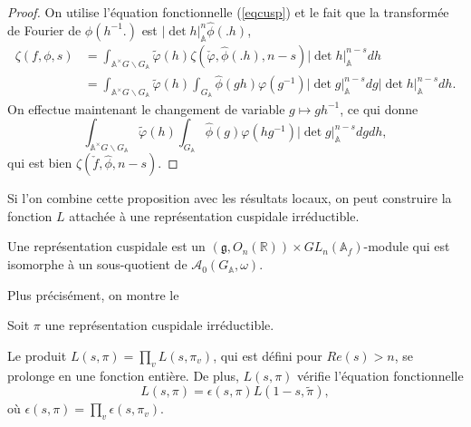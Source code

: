 \begin{proof}
On utilise l'équation fonctionnelle (\ref{eqcusp}) et le fait que la transformée de Fourier de $\phi(h^{-1}.)$ est $|\det h|_\mathbb{A}^n\hat{\phi}(.h)$,
\begin{align}
\zeta(f, \phi, s) &= \int_{\mathbb{A}^\times G \backslash G_\mathbb{A}} \tilde{\varphi}(h) \zeta(\check{\varphi}, \hat{\phi}(.h), n-s)|\det h|_\mathbb{A}^{n-s} dh \\
&= \int_{\mathbb{A}^\times G \backslash G_\mathbb{A}} \tilde{\varphi}(h) \int_{G_\mathbb{A}}\hat{\phi}(gh)\varphi(g^{-1})|\det g|_\mathbb{A}^{n-s} dg |\det h|_\mathbb{A}^{n-s} dh.
\end{align}
On effectue maintenant le changement de variable $g \mapsto gh^{-1}$, ce qui donne
\begin{equation}
\int_{\mathbb{A}^\times G \backslash G_\mathbb{A}} \tilde{\varphi}(h) \int_{G_\mathbb{A}}\hat{\phi}(g)\varphi(hg^{-1})|\det g|_\mathbb{A}^{n-s} dg dh,
\end{equation}
qui est bien $\zeta(\check{f}, \hat{\phi}, n-s)$.
\end{proof}

Si l'on combine cette proposition avec les résultats locaux, on peut construire la fonction $L$ attachée à une représentation cuspidale irréductible.
\begin{definition}
Une représentation cuspidale est un $(\mathfrak{g}, O_n(\mathbb{R})) \times GL_n(\mathbb{A}_f)$-module qui est isomorphe à un sous-quotient de $\mathcal{A}_0(G_\mathbb{A}, \omega)$.
\end{definition}

Plus précisément, on montre le
\begin{theoreme}
Soit $\pi$ une représentation cuspidale irréductible.

Le produit $L(s, \pi) = \prod_v L(s, \pi_v)$, qui est défini pour $Re(s) > n$, se prolonge en une fonction entière. De plus, $L(s, \pi)$ vérifie l'équation fonctionnelle
\begin{equation}
L(s,\pi) = \epsilon(s,\pi)L(1-s,\tilde{\pi}),
\end{equation}
où $\epsilon(s,\pi) = \prod_v \epsilon(s, \pi_v)$.
\end{theoreme}

